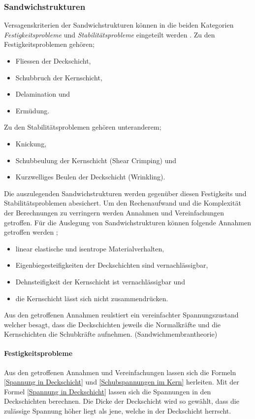   \subsubsection{Sandwichstrukturen}
  Versagenskriterien der Sandwichstrukturen können in die beiden Kategorien \emph{Festigkeitsprobleme} und \emph{Stabilitätsprobleme} eingeteilt werden \cite{ETH}. Zu den Festigkeitsproblemen gehören;
  \begin{itemize}
    \item Fliessen der Deckschicht,
    \item Schubbruch der Kernschicht,
    \item Delamination und
    \item Ermüdung.
  \end{itemize}

  Zu den Stabilitätsproblemen gehören unteranderem;
  \begin{itemize}
    \item Knickung,
    \item Schubbeulung der Kernschicht (Shear Crimping) und
    \item Kurzwelliges Beulen der Deckschicht (Wrinkling).
  \end{itemize}

  Die auszulegenden Sandwichstrukturen werden gegenüber diesen Festigkeits und Stabilitätsproblemen abesichert. Um den Rechenaufwand und die Komplexität der Berechnungen zu verringern werden Annahmen und Vereinfachungen getroffen. Für die Auslegung von Sandwichstrukturen können folgende Annahmen getroffen werden \cite{klein}\cite{ETH};
  \begin{itemize}
    \item linear elastische und isentrope Materialverhalten,
    \item Eigenbiegesteifigkeiten der Deckschichten sind vernachlässigbar,
    \item Dehnsteifigkeit der Kernschicht ist vernachlässigbar und
    \item die Kernschicht lässt sich nicht zusammendrücken.
  \end{itemize}
  Aus den getroffenen Annahmen reulstiert ein vereinfachter Spannungszustand welcher besagt, dass die Deckschichten jeweils die Normalkräfte und die Kernschichten die Schubkräfte aufnehmen. (Sandwichmembrantheorie)

    \paragraph{Festigkeitsprobleme}
    Aus den getroffenen Annahmen und Vereinfachungen lassen sich die Formeln \ref{Spannung in Deckschicht} und \ref{Schubspannungen im Kern} herleiten. Mit der Formel \ref{Spannung in Deckschicht} lassen sich die Spannungen in den Deckschichten berechnen. Die Dicke der Deckschicht wird so gewählt, dass die zulässige Spannung höher liegt als jene, welche in der Deckschicht herrscht.

